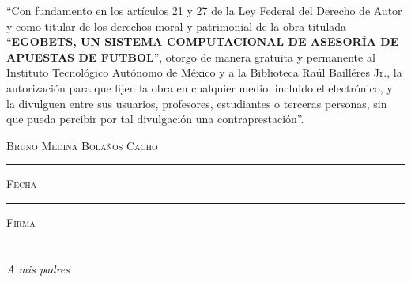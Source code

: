 
\thispagestyle{empty}
\vspace*{\fill}
\begingroup
``Con fundamento en los artículos 21 y 27 de la Ley Federal del Derecho de Autor y como titular de los derechos moral y patrimonial de la obra titulada ``\textbf{EGOBETS, UN SISTEMA COMPUTACIONAL DE ASESORÍA DE APUESTAS DE FUTBOL}'', otorgo de manera gratuita y permanente al Instituto Tecnológico Autónomo de México y a la Biblioteca Raúl Bailléres Jr., la autorización para que fijen la obra en cualquier medio, incluido el electrónico, y la divulguen entre sus usuarios, profesores, estudiantes o terceras personas, sin que pueda percibir por tal divulgación una contraprestación''.

\centering

\hspace{3em}

\textsc{Bruno Medina Bolaños Cacho}

\vspace{5em}

\rule[1em]{20em}{0.5pt} %

\textsc{Fecha}
 
\vspace{8em}

\rule[1em]{20em}{0.5pt} %

\textsc{Firma}

\endgroup
\vspace*{\fill}


\pagestyle{empty}
\frontmatter

\chapter*{}
\begin{flushright}
\textit{A mis padres}
\end{flushright}



